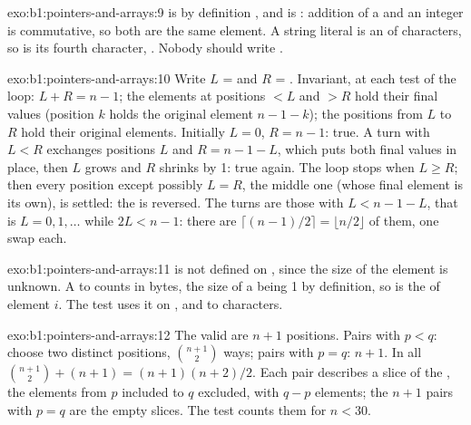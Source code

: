 \begin{solution}{exo:b1:pointers-and-arrays:9}
 is by definition , and  is : addition of a  and an integer
is commutative, so both are the same element. A string literal is an  of characters, so  is its
fourth character, . Nobody should write .
\end{solution}

\begin{solution}{exo:b1:pointers-and-arrays:10}
Write $L$ =  and $R$ = . Invariant, at each test of the loop: $L + R = n - 1$; the
elements at positions $< L$ and $> R$ hold their final values (position $k$ holds the original element $n - 1 - k$);
the positions from $L$ to $R$ hold their original elements. Initially $L = 0$, $R = n - 1$: true. A turn with
$L < R$ exchanges positions $L$ and $R = n - 1 - L$, which puts both final values in place, then $L$ grows and $R$
shrinks by 1: true again. The loop stops when $L \geq R$; then every position except possibly $L = R$, the middle one
(whose final element is its own), is settled: the  is reversed. The turns are those with $L < n - 1 - L$, that is
$L = 0, 1, \dots$ while $2L < n - 1$: there are $\lceil (n-1)/2 \rceil = \lfloor n/2 \rfloor$ of them, one swap each.
\end{solution}

\begin{solution}{exo:b1:pointers-and-arrays:11}
 is not defined on , since the size of the element is unknown. A  to
 counts in bytes, the size of a  being 1 by definition, so  is the 
of element $i$. The test  uses it on ,  and  to
characters.
\end{solution}

\begin{solution}{exo:b1:pointers-and-arrays:12}
The valid  are $n + 1$ positions. Pairs with $p < q$: choose two distinct positions, $\binom{n+1}{2}$ ways;
pairs with $p = q$: $n + 1$. In all $\binom{n+1}{2} + (n+1) = (n+1)(n+2)/2$. Each pair describes a slice of the ,
the elements from $p$ included to $q$ excluded, with $q - p$ elements; the $n + 1$ pairs with $p = q$ are the empty
slices. The test  counts them for $n < 30$.
\end{solution}

